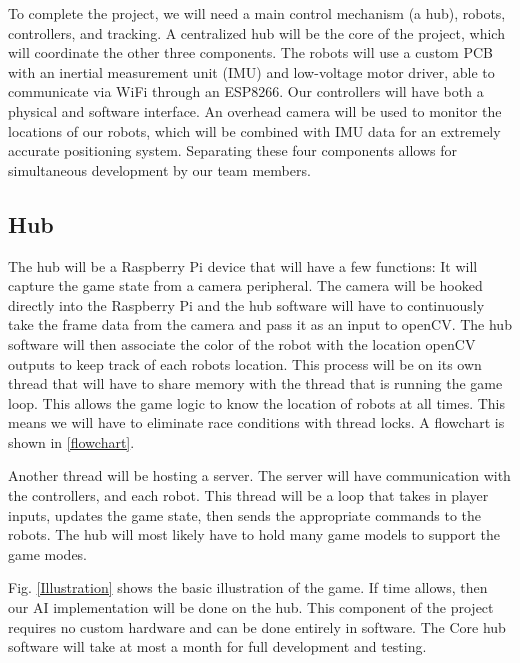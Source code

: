 \documentclass[11pt]{ieeeconf}
\begin{document}
To complete the project, we will need a main control mechanism (a hub), robots, controllers, and tracking. A centralized hub will be the core of the project, which will coordinate the other three components. The robots will use a custom PCB with an inertial measurement unit (IMU) and low-voltage motor driver, able to communicate via WiFi through an ESP8266. Our controllers will have both a physical and software interface. An overhead camera will be used to monitor the locations of our robots, which will be combined with IMU data for an extremely accurate positioning system. Separating these four components allows for simultaneous development by our team members.

\subsection{Hub}
The hub will be a Raspberry Pi device that will have a few functions:
It will capture the game state from a camera peripheral. The camera will be hooked directly into the Raspberry Pi and the hub software will have to continuously take the frame data from the camera and pass it as an input to openCV. The hub software will then associate the color of the robot with the location openCV outputs to keep track of each robots location. This process will be on its own thread that will have to share memory with the thread that is running the game loop. This allows the game logic to know the location of robots at all times. This means we will have to eliminate race conditions with thread locks. A flowchart is shown in \ref{flowchart}.

Another thread will be hosting a server. The server will have communication with the controllers, and each robot. This thread will be a loop that takes in player inputs, updates the game state, then sends the appropriate commands to the robots. The hub will most likely have to hold many game models to support the game modes.

Fig. \ref{Illustration} shows the basic illustration of the game. If time allows, then our AI implementation will be done on the hub. This component of the project requires no custom hardware and can be done entirely in software. The Core hub software will take at most a month for full development and testing. 
\end{document}

